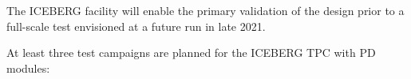
The ICEBERG facility will enable the primary validation of the  design prior to a full-scale test envisioned at a future  run in late 2021. 

At least three test campaigns are planned for the ICEBERG TPC with PD modules:  

